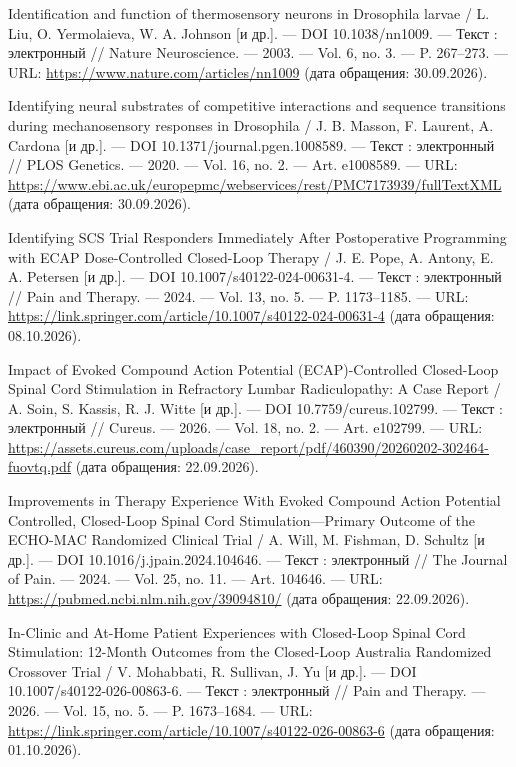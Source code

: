 \begin{list}{}{\setlength{\leftmargin}{10mm}\setlength{\labelwidth}{8mm}\setlength{\labelsep}{2mm}\setlength{\itemsep}{0pt}\setlength{\parsep}{0pt}\setlength{\topsep}{0pt}}
\item[157.] Identification and function of thermosensory neurons in Drosophila larvae / L. Liu, O. Yermolaieva, W. A. Johnson [и др.]. — DOI 10.1038/nn1009. — Текст : электронный // Nature Neuroscience. — 2003. — Vol. 6, no. 3. — P. 267–273. — URL: \url{https://www.nature.com/articles/nn1009} (дата обращения: 30.09.2026).
\item[158.] Identifying neural substrates of competitive interactions and sequence transitions during mechanosensory responses in Drosophila / J. B. Masson, F. Laurent, A. Cardona [и др.]. — DOI 10.1371/journal.pgen.1008589. — Текст : электронный // PLOS Genetics. — 2020. — Vol. 16, no. 2. — Art. e1008589. — URL: \url{https://www.ebi.ac.uk/europepmc/webservices/rest/PMC7173939/fullTextXML} (дата обращения: 30.09.2026).
\item[159.] Identifying SCS Trial Responders Immediately After Postoperative Programming with ECAP Dose-Controlled Closed-Loop Therapy / J. E. Pope, A. Antony, E. A. Petersen [и др.]. — DOI 10.1007/s40122-024-00631-4. — Текст : электронный // Pain and Therapy. — 2024. — Vol. 13, no. 5. — P. 1173–1185. — URL: \url{https://link.springer.com/article/10.1007/s40122-024-00631-4} (дата обращения: 08.10.2026).
\item[160.] Impact of Evoked Compound Action Potential (ECAP)-Controlled Closed-Loop Spinal Cord Stimulation in Refractory Lumbar Radiculopathy: A Case Report / A. Soin, S. Kassis, R. J. Witte [и др.]. — DOI 10.7759/cureus.102799. — Текст : электронный // Cureus. — 2026. — Vol. 18, no. 2. — Art. e102799. — URL: \url{https://assets.cureus.com/uploads/case\_report/pdf/460390/20260202-302464-fuovtq.pdf} (дата обращения: 22.09.2026).
\item[161.] Improvements in Therapy Experience With Evoked Compound Action Potential Controlled, Closed-Loop Spinal Cord Stimulation—Primary Outcome of the ECHO-MAC Randomized Clinical Trial / A. Will, M. Fishman, D. Schultz [и др.]. — DOI 10.1016/j.jpain.2024.104646. — Текст : электронный // The Journal of Pain. — 2024. — Vol. 25, no. 11. — Art. 104646. — URL: \url{https://pubmed.ncbi.nlm.nih.gov/39094810/} (дата обращения: 22.09.2026).
\item[162.] In-Clinic and At-Home Patient Experiences with Closed-Loop Spinal Cord Stimulation: 12-Month Outcomes from the Closed-Loop Australia Randomized Crossover Trial / V. Mohabbati, R. Sullivan, J. Yu [и др.]. — DOI 10.1007/s40122-026-00863-6. — Текст : электронный // Pain and Therapy. — 2026. — Vol. 15, no. 5. — P. 1673–1684. — URL: \url{https://link.springer.com/article/10.1007/s40122-026-00863-6} (дата обращения: 01.10.2026).

\end{list}
